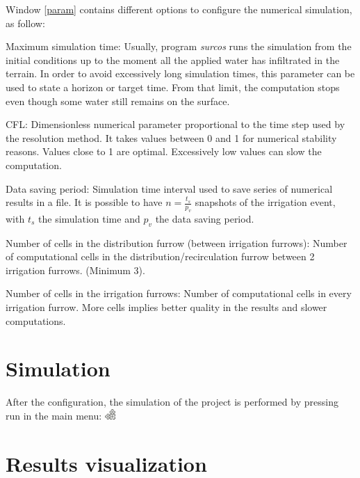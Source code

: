 Window \ref{param} contains different options to configure the numerical simulation, as follow:

\begin{description}
\item{Maximum simulation time}: Usually, program \emph{surcos} runs the simulation from the initial conditions up to the moment all the applied water has infiltrated in the terrain. In order to avoid excessively long simulation times, this parameter can be used to state a horizon or target time. From that limit, the computation stops even though some water still remains on the surface.
\item{CFL}: Dimensionless numerical parameter proportional to the time step used by the resolution method. It takes values between 0 and 1 for numerical stability reasons. Values close to 1 are optimal. Excessively low values can slow the computation.
\item{Data saving period}: Simulation time interval used to save series of numerical results in a file. It is possible to have $ n=\frac{t_s}{p_v}$ snapshots of the irrigation event, with $ t_s $ the simulation time and $ p_v $ the data saving period.  
\item{Number of cells in the distribution furrow (between irrigation furrows)}: Number of computational cells in the distribution/recirculation furrow between 2 irrigation furrows. (Minimum 3).
\item{Number of cells in the irrigation furrows}: Number of computational cells in every irrigation furrow. More cells implies better quality in the results and slower computations.
\end{description}


\section{Simulation}

After the configuration, the simulation of the project is performed by pressing run in the main menu:
\includegraphics[height=0.4cm]{images/gtk-execute.png}

\section{Results visualization}


